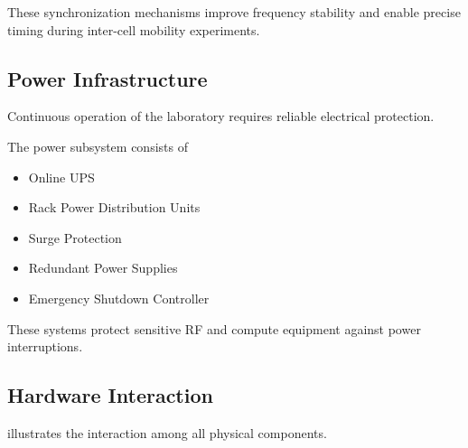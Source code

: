\documentclass[12pt,a4paper]{article}\usepackage[a4paper,margin=1in]{geometry}\usepackage{graphicx}\usepackage{longtable}\usepackage{booktabs}\usepackage{hyperref}\usepackage{enumitem}\usepackage{amsmath}\usepackage{tikz}\usepackage{pgfgantt}\usepackage{setspace}\setstretch{1.15}\usetikzlibrary{positioning,arrows.meta,shapes.geometric}
\begin{document}
	These synchronization mechanisms improve frequency stability and enable precise timing during inter-cell mobility experiments.
	
	
	\subsection{Power Infrastructure}
	
	Continuous operation of the laboratory requires reliable electrical protection.
	
	The power subsystem consists of
	
	\begin{itemize}
		
		\item Online UPS
		
		\item Rack Power Distribution Units
		
		\item Surge Protection
		
		\item Redundant Power Supplies
		
		\item Emergency Shutdown Controller
		
	\end{itemize}
	
	These systems protect sensitive RF and compute equipment against power interruptions.
	
	
	\subsection{Hardware Interaction}
	
	 illustrates the interaction among all physical components.
	
\end{document}
